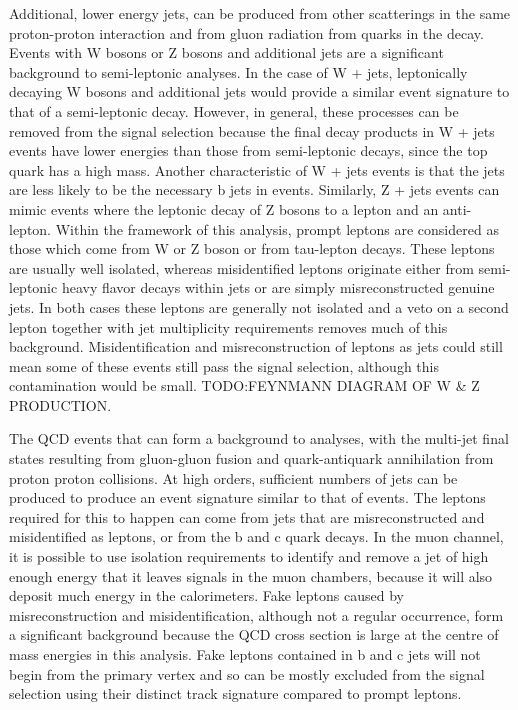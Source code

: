 Additional, lower energy jets, can be produced from other scatterings in the same proton-proton interaction
and from gluon radiation from quarks in the decay. Events with W bosons or Z bosons and additional jets are a
significant background to semi-leptonic \ttbar analyses. In the case of W + jets, leptonically decaying W
bosons and additional jets would provide a similar event signature to that of a semi-leptonic \ttbar decay.
However, in general, these processes can be removed from the signal selection because the final decay products
in W + jets events have lower energies than those from semi-leptonic \ttbar decays, since the top quark has a
high mass. Another characteristic of W + jets events is that the jets are less likely to be the necessary b
jets in \ttbar events. Similarly, Z + jets events can mimic \ttbar events where the leptonic decay of Z bosons
to a lepton and an anti-lepton. Within the framework of this analysis, prompt leptons are considered as those
which come from W or Z boson or from tau-lepton decays. These leptons are usually well isolated, whereas
misidentified leptons originate either from semi-leptonic heavy flavor decays within jets or are simply
misreconstructed genuine jets. In both cases these leptons are generally not isolated and a veto on a second
lepton together with jet multiplicity requirements removes much of this background. Misidentification and
misreconstruction of leptons as jets could still mean some of these events still pass the signal selection,
although this contamination would be small. TODO:FEYNMANN DIAGRAM OF W \& Z PRODUCTION.



The QCD events that can form a background to \ttbar analyses, with the multi-jet final states resulting from
gluon-gluon fusion and quark-antiquark annihilation from proton proton collisions. At high orders, sufficient
numbers of jets can be produced to produce an event signature similar to that of \ttbar events. The leptons
required for this to happen can come from jets that are misreconstructed and misidentified as leptons, or from
the b and c quark decays. In the muon channel, it is possible to use isolation requirements to identify and
remove a jet of high enough energy that it leaves signals in the muon chambers, because it will also deposit
much energy in the calorimeters. Fake leptons caused by misreconstruction and misidentification, although not
a regular occurrence, form a significant background because the QCD cross section is large at the centre of
mass energies in this analysis. Fake leptons contained in b and c jets will not begin from the primary vertex
and so can be mostly excluded from the signal selection using their distinct track signature compared to prompt
leptons.

